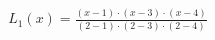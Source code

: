 \documentclass[preview]{standalone}
\begin{document}
\begin{align*}
L_1(x) = \frac{(x - 1) \cdot (x - 3) \cdot (x - 4)}{(2 - 1) \cdot (2 - 3) \cdot (2 - 4)}
\end{align*}
\end{document}
